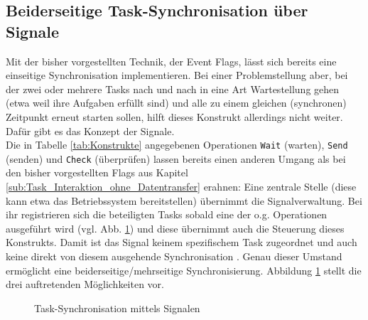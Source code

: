 \documentclass{llncs}
\begin{document}
\subsection{Beiderseitige Task-Synchronisation über Signale}
\label{subsec:Task_Synchronisation_Signale}
Mit der bisher vorgestellten Technik, der Event Flags, lässt sich bereits eine einseitige Synchronisation implementieren. Bei einer Problemstellung aber, bei der zwei oder mehrere Tasks nach und nach in eine Art Wartestellung gehen (etwa weil ihre Aufgaben erfüllt sind) und alle zu einem gleichen (synchronen) Zeitpunkt erneut starten sollen, hilft dieses Konstrukt allerdings nicht weiter. Dafür gibt es das Konzept der Signale.\\

Die in Tabelle \ref{tab:Konstrukte} angegebenen Operationen \texttt{Wait} (warten), \texttt{Send} (senden) und \texttt{Check} (überprüfen) lassen bereits einen anderen Umgang als bei den bisher vorgestellten Flags aus Kapitel \ref{sub:Task_Interaktion_ohne_Datentransfer} erahnen: Eine zentrale Stelle (diese kann etwa das Betriebssystem bereitstellen) übernimmt die Signalverwaltung. Bei ihr registrieren sich die beteiligten Tasks sobald eine der o.g. Operationen ausgeführt wird (vgl. Abb. \ref{fig:Signale_gesamt}) und diese übernimmt auch die Steuerung dieses Konstrukts. Damit ist das Signal keinem spezifischem Task zugeordnet und auch keine direkt von diesem ausgehende Synchronisation \autocite[vgl.][91]{Cooling2017}. Genau dieser Umstand ermöglicht eine beiderseitige/mehrseitige Synchronisierung. Abbildung \ref{fig:Signale_gesamt} stellt die drei auftretenden Möglichkeiten vor.

\begin{figure}[h]
	\centering
	\begin{subfigure}{.40\columnwidth} %
		\def\svgwidth{\columnwidth}
		
	\end{subfigure}
	\caption{\label{fig:Signale_gesamt}Task-Synchronisation mittels Signalen \autocite[vgl.][90]{Cooling2017}}
\end{figure}
\end{document}
